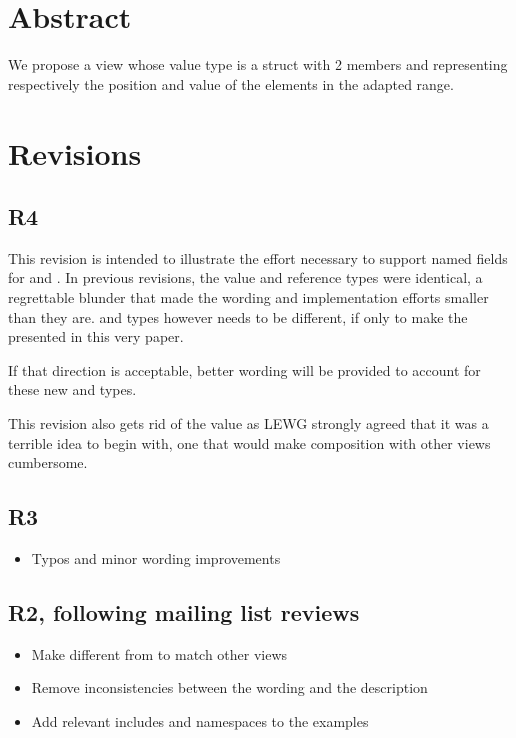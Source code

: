 \documentclass{wg21}
\title{\tcode{views::enumerate}}
\author{Corentin Jabot}{corentin.jabot@gmail.com}
\begin{document}
\maketitle


\section{Abstract}

We propose a view  whose value type is a struct with 2 members  and 
representing respectively the position and value of the elements in the adapted range.

\section{Revisions}

\subsection{R4}

This revision is intended to illustrate the effort necessary to support named fields for  and .
In previous revisions, the value and reference types were identical, a regrettable blunder that made the wording and implementation efforts smaller than they are.
 and  types however needs to be different, if only to make the  presented in this very paper.

If that direction is acceptable, better wording will be provided to account for these new  and  types.

This revision also gets rid of the   value as LEWG strongly agreed that it was a terrible idea to begin with,
one that would make composition with other views cumbersome.

\subsection{R3}

\begin{itemize}
    \item Typos and minor wording improvements
\end{itemize}

\subsection{R2, following mailing list reviews}
\begin{itemize}
    \item Make  different from   to match other views
    \item Remove inconsistencies between the wording and the description
    \item Add relevant includes and namespaces to the examples
\end{itemize}
\end{document}
